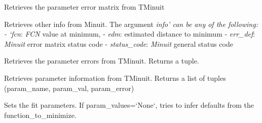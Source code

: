 \documentclass[letterpaper,10pt,english]{sphinxmanual}
\begin{document}
\begin{fulllineitems}
\begin{fulllineitems}
\end{fulllineitems}


\begin{fulllineitems}
\label{api/kafe:kafe.minuit.Minuit.get_error_matrix}
Retrieves the parameter error matrix from TMinuit

\end{fulllineitems}


\begin{fulllineitems}
\label{api/kafe:kafe.minuit.Minuit.get_fit_info}
Retrieves other info from Minuit. The argument \emph{info' can be any of the following:
- {}`fcn}: \emph{FCN} value at minimum,
- \emph{edm}: estimated distance to minimum
- \emph{err\_def}: \emph{Minuit} error matrix status code
- \emph{status\_code}: \emph{Minuit} general status code

\end{fulllineitems}


\begin{fulllineitems}
\label{api/kafe:kafe.minuit.Minuit.get_parameter_errors}
Retrieves the parameter errors from TMinuit. Returns a tuple.

\end{fulllineitems}


\begin{fulllineitems}
\label{api/kafe:kafe.minuit.Minuit.get_parameter_info}
Retrieves parameter information from TMinuit. Returns a list of tuples (param\_name, param\_val, param\_error)

\end{fulllineitems}


\begin{fulllineitems}
\label{api/kafe:kafe.minuit.Minuit.get_parameter_name}
Sets the fit parameters. If param\_values={}`None{}`, tries to infer defaults from the function\_to\_minimize.


\end{fulllineitems}
\end{fulllineitems}
\end{document}
